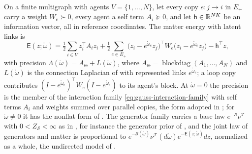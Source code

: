 On a finite multigraph with agents \(V=\{1,\ldots,N\}\), let every copy \(e:j\to i\) in \(E_+\) carry a
weight \(W_e\succ0\), every agent a self term \(A_i\succeq0\), and let \(\mathsf h\in\mathbb R^{NK}\) be an
information vector, all in reference coordinates. The matter energy with latent links is
\begin{equation}
\mathsf E(z;\mathring\omega)
=\tfrac12\sum_{i\in V}z_i^\top A_iz_i
+\tfrac12\sum_{e\in E_+}\bigl(z_i-e^{\mathring\omega_e}z_j\bigr)^\top W_e\bigl(z_i-e^{\mathring\omega_e}z_j\bigr)
-\mathsf h^\top z,
\label{eq:glink-matter-energy}
\end{equation}
with precision \(\Lambda(\mathring\omega)=A_\oplus+L(\mathring\omega)\), where
\(A_\oplus=\operatorname{blockdiag}(A_1,\ldots,A_N)\) and \(L(\mathring\omega)\) is the connection
Laplacian of  with represented links \(e^{\mathring\omega_e}\); a loop
copy contributes \((I-e^{\mathring\omega_e})^\top W_e(I-e^{\mathring\omega_e})\) to its agent's block.
At \(\mathring\omega=0\) the precision is the member of the interaction family
\eqref{eq:gauss-interaction-family} with self terms \(A_i\) and weights summed over parallel copies,
the form adopted in ; for \(\mathring\omega\neq0\) it has the
nonflat form of . The generator family carries a base law
\(e^{-\mathscr S}\nu^{\mathscr T}\) with \(0<Z_{\mathscr S}<\infty\) as in
, for instance the generator prior of ,
and the joint law of generators and matter is proportional to
\(e^{-\mathscr S(\mathring\omega)}\nu^{\mathscr T}(d\mathring\omega)e^{-\mathsf E(z;\mathring\omega)}dz\),
normalized as a whole, the undirected model of .

